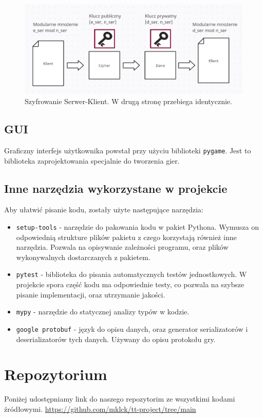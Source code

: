 \documentclass[a4paper,12pt]{article}
\begin{document}
\begin{figure}[ht]
	\centerline{\includegraphics[scale=0.6]{ProceszSzyfrowania.png}}
	\caption{Szyfrowanie Serwer-Klient. W drugą stronę przebiega identycznie.}
\end{figure}

\subsection{GUI}

Graficzny interfejs użytkownika powstał przy użyciu biblioteki \texttt{pygame}. Jest to
biblioteka zaprojektowania specjalnie do tworzenia gier.

\subsection{Inne narzędzia wykorzystane w projekcie}

Aby ułatwić pisanie kodu, zostały użyte następujące narzędzia:

\begin{itemize}
	\item \texttt{setup-tools} - narzędzie do pakowania kodu w pakiet Pythona.
	Wymusza on odpowiednią strukture plików pakietu z czego korzystają również
	inne narzędzia. Pozwala na opisywanie zależności programu, oraz plików
	wykonywalnych dostarczanych z pakietem.
	\item \texttt{pytest} - biblioteka do pisania automatycznych testów jednostkowych.
	W projekcie spora część kodu ma odpowiednie testy, co pozwala na szybsze pisanie
	implementacji, oraz utrzymanie jakości.
	\item \texttt{mypy} - narzędzie do statycznej analizy typów w kodzie.
	\item \texttt{google protobuf} - język do opisu danych, oraz generator
	serializatorów i deserializatorów tych danych. Używany do opisu protokołu
	gry.
\end{itemize}

\section{Repozytorium}
Poniżej udostępniamy link do naszego repozytorim ze wszystkimi kodami źródłowymi.
\newline
\url{https://github.com/mklck/tt-project/tree/main}
\end{document}
